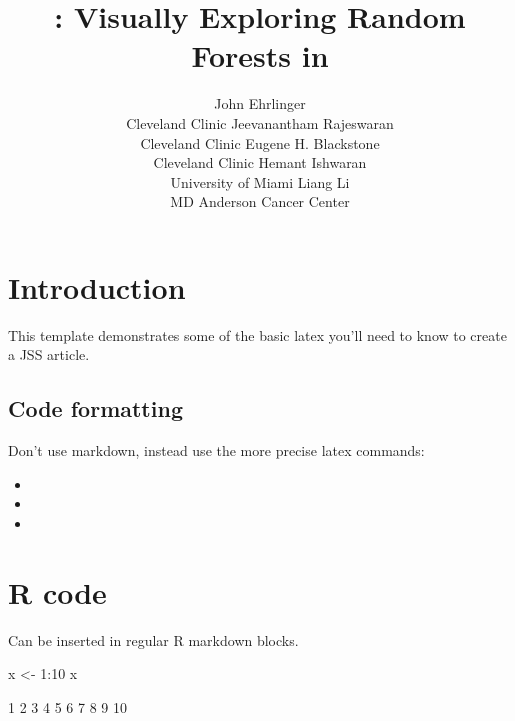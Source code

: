 \documentclass[article]{jss}
\author{
John Ehrlinger\\Cleveland Clinic \And Jeevanantham Rajeswaran\\Cleveland Clinic \And Eugene H. Blackstone\\Cleveland Clinic \And Hemant Ishwaran\\University of Miami \And Liang Li\\MD Anderson Cancer Center
}
\title{\pkg{ggRandomForests}: Visually Exploring Random Forests in \proglang{R}}
\begin{document}
\section{Introduction}\label{introduction}

This template demonstrates some of the basic latex you'll need to know
to create a JSS article.

\subsection{Code formatting}\label{code-formatting}

Don't use markdown, instead use the more precise latex commands:

\begin{itemize}
\itemsep1pt\parskip0pt
\item
\item
\item
\end{itemize}

\section{R code}\label{r-code}

Can be inserted in regular R markdown blocks.

\begin{CodeChunk}
\begin{CodeInput}
x <- 1:10
x
\end{CodeInput}
\begin{CodeOutput}
 [1]  1  2  3  4  5  6  7  8  9 10
\end{CodeOutput}
\end{CodeChunk}
\end{document}
